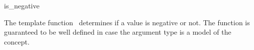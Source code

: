\begin{ccRefFunction}{is_negative}

\ccDefinition

The template function \ccRefName\ determines if a value is negative or not.
The function is guaranteed to be well defined in case the argument type 
is a model of the  concept. 

 


\ccSeeAlso
{} \\
\\

\end{ccRefFunction}

